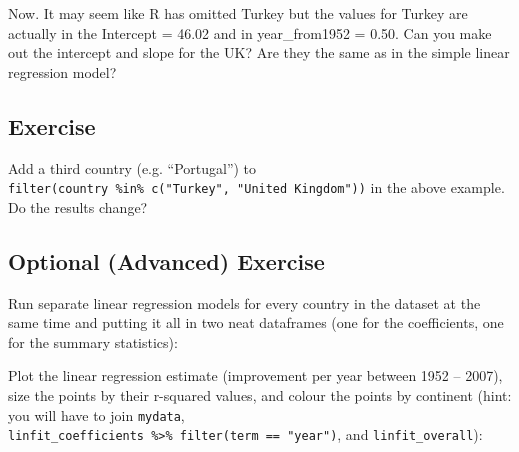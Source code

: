 \documentclass[]{book}
\makeatletter
\newenvironment{Shaded}{\begin{snugshade}}{\end{snugshade}}
\newcommand{\KeywordTok}[1]{\textcolor[rgb]{0.13,0.29,0.53}{\textbf{#1}}}
\newcommand{\DataTypeTok}[1]{\textcolor[rgb]{0.13,0.29,0.53}{#1}}
\newcommand{\StringTok}[1]{\textcolor[rgb]{0.31,0.60,0.02}{#1}}
\newcommand{\OperatorTok}[1]{\textcolor[rgb]{0.81,0.36,0.00}{\textbf{#1}}}
\newcommand{\NormalTok}[1]{#1}
\newenvironment{kframe}{%
\medskip{}
\setlength{\fboxsep}{.8em}
 \def\at@end@of@kframe{}%
 \ifinner\ifhmode%
  \def\at@end@of@kframe{\end{minipage}}%
  \begin{minipage}{\columnwidth}%
 \fi\fi%
 \def\FrameCommand##1{\hskip\@totalleftmargin \hskip-\fboxsep
 \colorbox{shadecolor}{##1}\hskip-\fboxsep
     \hskip-\linewidth \hskip-\@totalleftmargin \hskip\columnwidth}%
 \MakeFramed {\advance\hsize-\width
   \@totalleftmargin\z@ \linewidth\hsize
   \@setminipage}}%
 {\par\unskip\endMakeFramed%
 \at@end@of@kframe}
\renewenvironment{Shaded}{\begin{kframe}}{\end{kframe}}
\makeatother
\begin{document}
Now. It may seem like R has omitted Turkey but the values for Turkey are
actually in the Intercept = 46.02 and in year\_from1952 = 0.50. Can you
make out the intercept and slope for the UK? Are they the same as in the
simple linear regression model?

\subsection{Exercise}\label{exercise-40}

Add a third country (e.g. ``Portugal'') to
\texttt{filter(country\ \%in\%\ c("Turkey",\ "United\ Kingdom"))} in the
above example. Do the results change?

\subsection{Optional (Advanced)
Exercise}\label{optional-advanced-exercise-1}

Run separate linear regression models for every country in the dataset
at the same time and putting it all in two neat dataframes (one for the
coefficients, one for the summary statistics):

\begin{Shaded}
\end{Shaded}

Plot the linear regression estimate (improvement per year between 1952
-- 2007), size the points by their r-squared values, and colour the
points by continent (hint: you will have to join \texttt{mydata},
\texttt{linfit\_coefficients\ \%\textgreater{}\%\ filter(term\ ==\ "year")},
and \texttt{linfit\_overall}):
\end{document}
